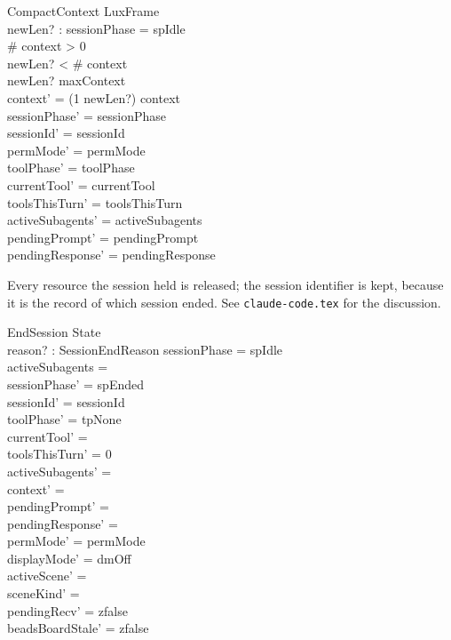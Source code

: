 \documentclass[a4paper,10pt,fleqn]{article}
\begin{document}
\begin{schema}{CompactContext}
  LuxFrame \\
  newLen? : \nat
  \where
  sessionPhase = spIdle \\
  \# context > 0 \\
  newLen? < \# context \\
  newLen? \leq maxContext \\
  context' = (1 \upto newLen?) \dres context \\
  sessionPhase' = sessionPhase \\
  sessionId' = sessionId \\
  permMode' = permMode \\
  toolPhase' = toolPhase \\
  currentTool' = currentTool \\
  toolsThisTurn' = toolsThisTurn \\
  activeSubagents' = activeSubagents \\
  pendingPrompt' = pendingPrompt \\
  pendingResponse' = pendingResponse
\end{schema}

Every resource the session held is released; the session identifier is
kept, because it is the record of which session ended. See
\texttt{claude-code.tex} for the discussion.

\begin{schema}{EndSession}
  \Delta State \\
  reason? : SessionEndReason
  \where
  sessionPhase = spIdle \\
  activeSubagents = \emptyset \\
  sessionPhase' = spEnded \\
  sessionId' = sessionId \\
  toolPhase' = tpNone \\
  currentTool' = \emptyset \\
  toolsThisTurn' = 0 \\
  activeSubagents' = \emptyset \\
  context' = \langle \rangle \\
  pendingPrompt' = \emptyset \\
  pendingResponse' = \emptyset \\
  permMode' = permMode \\
  displayMode' = dmOff \\
  activeScene' = \emptyset \\
  sceneKind' = \emptyset \\
  pendingRecv' = zfalse \\
  beadsBoardStale' = zfalse
\end{schema}
\end{document}
